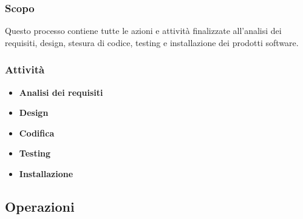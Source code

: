 \subsubsection{Scopo} Questo processo contiene tutte le azioni e attività finalizzate all'analisi dei requisiti, design, stesura di codice, testing e installazione dei prodotti software. 
\subsubsection{Attività}
\begin{itemize}
    \item \textbf{Analisi dei requisiti} 
    \item \textbf{Design} 
    \item \textbf{Codifica} 
    \item \textbf{Testing} 
    \item \textbf{Installazione} 
\end{itemize}

\subsection{Operazioni}


